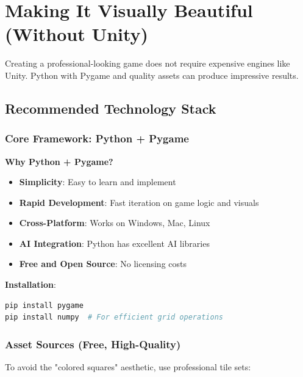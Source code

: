 \documentclass[12pt,a4paper]{article}
\begin{document}
\section{Making It Visually Beautiful (Without Unity)}

Creating a professional-looking game does not require expensive engines like Unity. Python with Pygame and quality assets can produce impressive results.

\subsection{Recommended Technology Stack}

\subsubsection{Core Framework: Python + Pygame}

\textbf{Why Python + Pygame?}
\begin{itemize}
    \item \textbf{Simplicity}: Easy to learn and implement
    \item \textbf{Rapid Development}: Fast iteration on game logic and visuals
    \item \textbf{Cross-Platform}: Works on Windows, Mac, Linux
    \item \textbf{AI Integration}: Python has excellent AI libraries
    \item \textbf{Free and Open Source}: No licensing costs
\end{itemize}

\textbf{Installation}:
\begin{lstlisting}[language=bash]
pip install pygame
pip install numpy  # For efficient grid operations
\end{lstlisting}

\subsubsection{Asset Sources (Free, High-Quality)}

To avoid the "colored squares" aesthetic, use professional tile sets:
\end{document}
